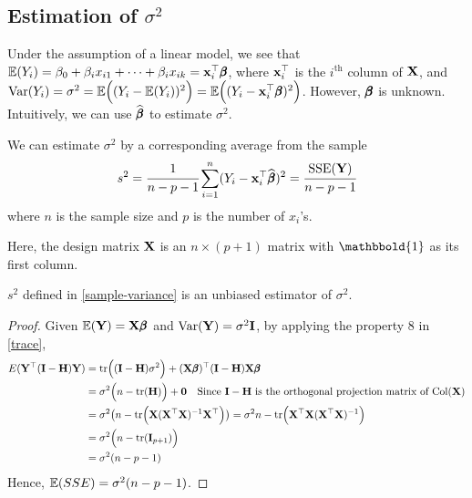     \subsection{Estimation of \texorpdfstring{$\sigma^2$}{}}
    Under the assumption of a linear model, we see that $\mathbb{E}(Y_i) = \beta_0 + \beta_ix_{i1} + \cdots + \beta_ix_{ik} = \mathbf{x}_i^{\top}\pmb{\beta}$, where $\mathbf{x}_i^{\top}$ is the $i^{\text{th}}$ column of $\mathbf{X}$, and $\text{Var}(Y_i) = \sigma^2 = \mathbb{E}\Big( (Y_i - \mathbb{E}(Y_i))^2 \Big) = \mathbb{E}\Big( (Y_i - \mathbf{x}_i^{\top}\pmb{\beta})^2 \Big)$. However, $\pmb{\beta}$ is unknown. Intuitively, we can use $\widehat{\pmb{\beta}}$ to estimate $\sigma^2$.
    \begin{Def}\label{sample-variance}
        We can estimate $\sigma^2$ by a corresponding average from the sample
        \begin{equation}
            s^2 = \cfrac{1}{n - p - 1}\sum_{i = 1}^n (Y_i - \mathbf{x}_i^{\top}\widehat{\pmb{\beta}})^2 = \cfrac{\text{SSE}(\mathbf{Y})}{n - p - 1}
        \end{equation}
        where $n$ is the sample size and $p$ is the number of $x_i$'s.
        \begin{Rem}
            Here, the design matrix $\mathbf{X}$ is an $n\times (p + 1)$ matrix with $\mathbbold{1}$ as its first column.
        \end{Rem}
    \end{Def}

    \begin{Thm}
        $s^2$ defined in \cref{sample-variance} is an unbiased estimator of $\sigma^2$.
        \begin{proof}
            Given $\mathbb{E}(\mathbf{Y}) = \mathbf{X}\pmb{\beta}$ and $\text{Var}(\mathbf{Y}) = \sigma^2 \mathbf{I}$, by applying the property 8 in \cref{trace},
            \begin{align*}
                E(\mathbf{Y}^{\top}(\mathbf{I} - \mathbf{H})\mathbf{Y}) &= \text{tr}\Big( (\mathbf{I} - \mathbf{H}) \sigma^2 \Big) + (\mathbf{X}\pmb{\beta})^{\top}(\mathbf{I} - \mathbf{H})\mathbf{X}\pmb{\beta}\\
                & = \sigma^2 \Big(n - \text{tr}(\mathbf{H})\Big) + \mathbf{0}\quad \text{Since } \mathbf{I} - \mathbf{H} \text{ is the orthogonal projection matrix of } \text{Col}(\mathbf{X})\\
                & = \sigma^2 \big(n - \text{tr}\Big(\mathbf{X}(\mathbf{X}^{\top}\mathbf{X})^{-1}\mathbf{X}^{\top} \Big)\big) = \sigma^2 n - \text{tr}\Big(\mathbf{X}^{\top}\mathbf{X}(\mathbf{X}^{\top}\mathbf{X})^{-1} \Big)\\
                & = \sigma^2 \Big(n - \text{tr}(\mathbf{I}_{p+1})\Big)\\
                & = \sigma^2 (n - p - 1)
            \end{align*}
            Hence, $\mathbb{E}(SSE) = \sigma^2 (n - p - 1)$.
        \end{proof}
    \end{Thm}

